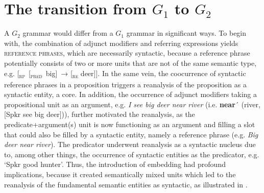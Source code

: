 \documentclass[output=paper,colorlinks,citecolor=brown]{langscibook}
\begin{document}
\section{The transition from $G_1$ to $G_2$}\label{sec:vanvalin:5}

A $G_2$ grammar would differ from a $G_1$ grammar in significant ways.  To begin with, the combination of adjunct modifiers and referring expressions yields \textsc{reference phrases}, which are necessarily syntactic, because a reference phrase potentially consists of two or more units that are not of the same semantic type, e.g. [\textsubscript{\scshape rp}~[\textsubscript{\scshape pred}~big]~→ [\textsubscript{\scshape re} deer]].  In the same vein, the coocurrence of syntactic reference phrases in a proposition triggers a reanalysis of the proposition as a syntactic entity, a core.  In addition, the occurrence of adjunct modifiers taking a propositional unit as an argument, e.g. \textit{I see big deer near river} (i.e. \textbf{near}´ (river, [Spkr see big deer])), further motivated the reanalysis, as the predicate+argument(s) unit is now functioning as an argument and filling a slot that could also be filled by a syntactic entity, namely a reference phrase (e.g. \textit{Big deer near river}).  The predicator underwent reanalysis as a syntactic nucleus due to, among other things, the occurrence of syntactic entities as the predicator, e.g. ‘Spkr good hunter’.  Thus, the introduction of embedding had profound implications, because it created semantically mixed units which led to the reanalysis of the fundamental semantic entities as syntactic, as illustrated in .
\end{document}
